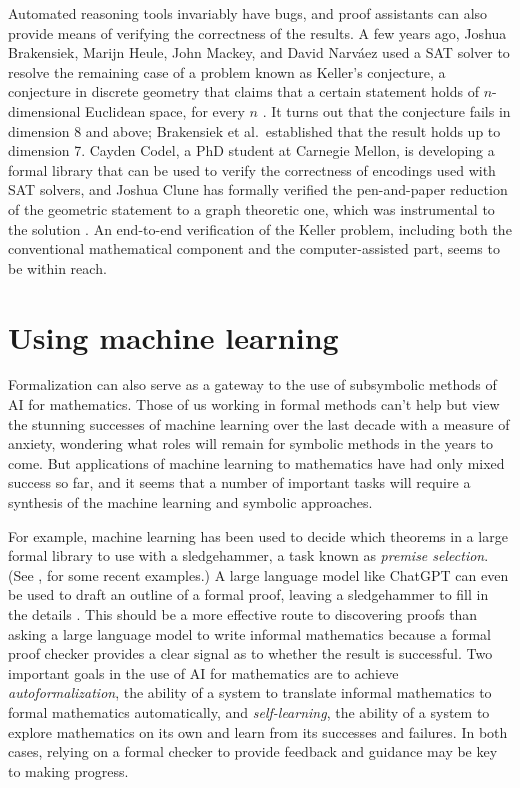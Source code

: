 \documentclass{amsart}
\theoremstyle{definition}
\theoremstyle{remark}
\numberwithin{equation}{section}
\begin{document}
Automated reasoning tools invariably have bugs, and proof assistants can also provide means of verifying the correctness of the results. A few years ago, Joshua Brakensiek, Marijn Heule, John Mackey, and David Narv\'aez used a SAT solver to resolve the remaining case of a problem known as Keller's conjecture, a conjecture in discrete geometry that claims that a certain statement holds of $n$-dimensional Euclidean space, for every $n$ \cite{brakensiek:et:al:20}. It turns out that the conjecture fails in dimension 8 and above; Brakensiek et al.~established that the result holds up to dimension 7. Cayden Codel, a PhD student at Carnegie Mellon, is developing a formal library that can be used to verify the correctness of encodings used with SAT solvers, and Joshua Clune has formally verified the pen-and-paper reduction of the geometric statement to a graph theoretic one, which was instrumental to the solution \cite{clune:23}. An end-to-end verification of the Keller problem, including both the conventional mathematical component and the computer-assisted part, seems to be within reach.


\section{Using machine learning}
\label{section:enabling:ai}

Formalization can also serve as a gateway to the use of subsymbolic methods of AI for mathematics. Those of us working in formal methods can't help but view the stunning successes of machine learning over the last decade with a measure of anxiety, wondering what roles will remain for symbolic methods in the years to come. But applications of machine learning to mathematics have had only mixed success so far, and it seems that a number of important tasks will require a synthesis of the machine learning and symbolic approaches.

For example, machine learning has been used to decide which theorems in a large formal library to use with a sledgehammer, a task known as \emph{premise selection}. (See \cite{goertzel:et:al:22,mikula:et:al:23}, for some recent examples.) A large language model like ChatGPT can even be used to draft an outline of a formal proof, leaving a sledgehammer to fill in the details \cite{jiang:et:al:22}. This should be a more effective route to discovering proofs than asking a large language model to write informal mathematics because a formal proof checker provides a clear signal as to whether the result is successful. Two important goals in the use of AI for mathematics are to achieve \emph{autoformalization}, the ability of a system to translate informal mathematics to formal mathematics automatically, and \emph{self-learning}, the ability of a system to explore mathematics on its own and learn from its successes and failures. In both cases, relying on a formal checker to provide feedback and guidance may be key to making progress.
\end{document}
